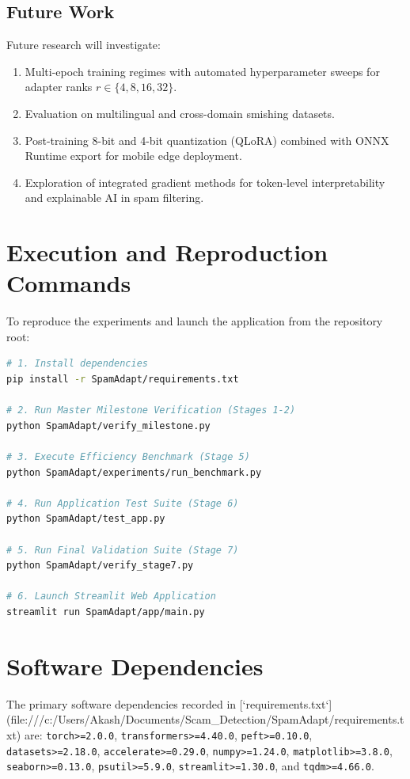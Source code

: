 \documentclass[conference]{IEEEtran}
\begin{document}
\subsection{Future Work}
Future research will investigate:
\begin{enumerate}
    \item Multi-epoch training regimes with automated hyperparameter sweeps for adapter ranks $r \in \{4, 8, 16, 32\}$.
    \item Evaluation on multilingual and cross-domain smishing datasets.
    \item Post-training 8-bit and 4-bit quantization (QLoRA) combined with ONNX Runtime export for mobile edge deployment.
    \item Exploration of integrated gradient methods for token-level interpretability and explainable AI in spam filtering.
\end{enumerate}




\appendices

\section{Execution and Reproduction Commands}
\label{app:commands}

To reproduce the experiments and launch the application from the repository root:
\begin{lstlisting}[language=bash]
# 1. Install dependencies
pip install -r SpamAdapt/requirements.txt

# 2. Run Master Milestone Verification (Stages 1-2)
python SpamAdapt/verify_milestone.py

# 3. Execute Efficiency Benchmark (Stage 5)
python SpamAdapt/experiments/run_benchmark.py

# 4. Run Application Test Suite (Stage 6)
python SpamAdapt/test_app.py

# 5. Run Final Validation Suite (Stage 7)
python SpamAdapt/verify_stage7.py

# 6. Launch Streamlit Web Application
streamlit run SpamAdapt/app/main.py
\end{lstlisting}

\section{Software Dependencies}
\label{app:dependencies}
The primary software dependencies recorded in [`requirements.txt`](file:///c:/Users/Akash/Documents/Scam_Detection/SpamAdapt/requirements.txt) are:
\texttt{torch>=2.0.0}, \texttt{transformers>=4.40.0}, \texttt{peft>=0.10.0}, \texttt{datasets>=2.18.0}, \texttt{accelerate>=0.29.0}, \texttt{numpy>=1.24.0}, \texttt{matplotlib>=3.8.0}, \texttt{seaborn>=0.13.0}, \texttt{psutil>=5.9.0}, \texttt{streamlit>=1.30.0}, and \texttt{tqdm>=4.66.0}.
\end{document}
